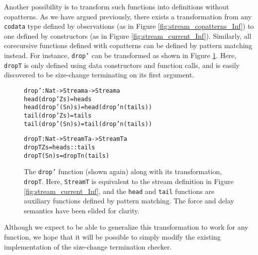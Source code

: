 Another possibility is to transform such functions into definitions without copatterns. As we have argued previously, there exists a transformation from any \texttt{codata} type defined by observations (as in Figure \ref{fig:stream_copatterns_Inf}) to one defined by constructors (as in Figure \ref{fig:stream_current_Inf}). Similarly, all corecursive functions defined with copatterns can be defined by pattern matching instead. For instance, \texttt{drop'} can be transformed as shown in Figure \ref{fig:drop'_dropT}. Here, \texttt{dropT} is only defined using data constructors and function calls, and is easily discovered to be size-change terminating on its first argument. 

\begin{figure}
\begin{alltt}
drop' : Nat -> Stream a -> Stream a
head (drop' Z     s) = head s
head (drop' (S n) s) = head (drop' n (tail s))
tail (drop' Z     s) = tail s
tail (drop' (S n) s) = tail (drop' n (tail s))

dropT : Nat -> StreamT a -> StreamT a
dropT Z     s = head s :: tail s
dropT (S n) s = dropT n (tail s)
\end{alltt}
\caption{The \texttt{drop'} function (shown again) along with its transformation, \texttt{dropT}. Here, \texttt{StreamT} is equivalent to the stream definition in Figure \ref{fig:stream_current_Inf}, and the \texttt{head} and \texttt{tail} functions are auxiliary functions defined by pattern matching. The force and delay semantics have been elided for clarity.}
\label{fig:drop'_dropT}
\end{figure}

Although we expect to be able to generalize this transformation to work for any function, we hope that it will be possible to simply modify the existing implementation of the size-change termination checker.

